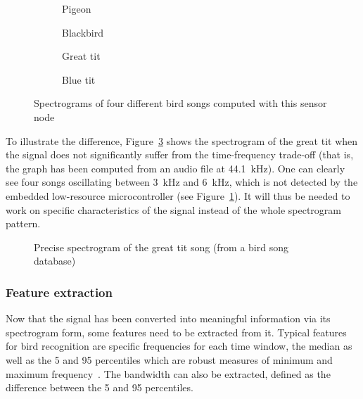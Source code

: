 \documentclass{EPL-master-thesis-covers-EN}
\begin{document}
\begin{figure}[H]
\begin{subfigure}{.49\textwidth}
  \centering
  
  \caption{Pigeon}
\end{subfigure}
\begin{subfigure}{.49\textwidth}
  \centering
  
  \caption{Blackbird}
\end{subfigure}
\newline
\begin{subfigure}{.49\textwidth}
  \centering
  
  \caption{Great tit}
  \label{fig:great_tit}
\end{subfigure}
\begin{subfigure}{.49\textwidth}
  \centering
  
  \caption{Blue tit}
\end{subfigure}
\caption{Spectrograms of four different bird songs computed with this sensor node}
\label{fig:4birds}
\end{figure}

To illustrate the difference, Figure~\ref{fig:greattit_full} shows the spectrogram of the great tit when the signal does not significantly suffer from the time-frequency trade-off (that is, the graph has been computed from an audio file at \SI{44.1}{kHz}). One can clearly see four songs oscillating between \SI{3}{kHz} and \SI{6}{kHz}, which is not detected by the embedded low-resource microcontroller (see Figure~\ref{fig:great_tit}). It will thus be needed to work on specific characteristics of the signal instead of the whole spectrogram pattern.

\begin{figure}[H]
    \centering
    
    \caption{Precise spectrogram of the great tit song (from a bird song database)}
    \label{fig:greattit_full}
\end{figure}

\subsubsection*{Feature extraction}

Now that the signal has been converted into meaningful information via its spectrogram form, some features need to be extracted from it. Typical features for bird recognition are specific frequencies for each time window, the median as well as the 5 and 95 percentiles which are robust measures of minimum and maximum frequency~\cite{Stowell}. The bandwidth can also be extracted, defined as the difference between the 5 and 95 percentiles. 
\end{document}
